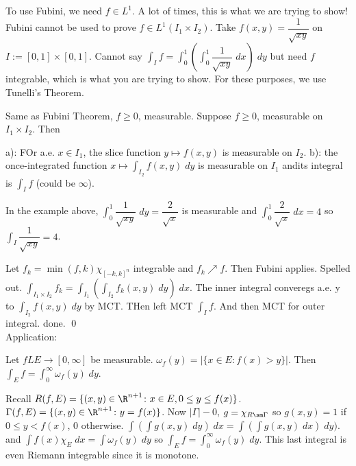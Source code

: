 To use Fubini, we need $f \in L^1$. A lot of times, this is what we are trying to show! Fubini cannot be used to prove $f \in L^1(I_1 \times I_2)$. Take $f(x,y)= \dfrac{1}{\sqrt{xy}}$ on $I:=[0,1] \times [0,1]$. Cannot say $\int_I f = \int_0^1( \int_0^1 \dfrac{1}{\sqrt{xy}} \; dx)\;dy$ but need $f$ integrable, which is what you are trying to show. For these purposes, we use Tunelli's Theorem.

\begin{thm}
Same as Fubini Theorem, $f \geq 0$, measurable. Suppose $f \geq 0$, measurable on $I_1 \times I_2$. Then 

a): FOr a.e. $x \in I_1$, the slice function $y \mapsto f(x,y)$ is measurable on $I_2$.
b): the once-integrated function $x \mapsto \int_{I_2} f(x,y) \; dy$ is measurable on $I_1$ andits integral is $\int_I f$ (could be $\infty$). 
\end{thm}


In the example above, $\int_0^1 \dfrac{1}{\sqrt{xy}} \; dy= \dfrac{2}{\sqrt{x}}$ is measurable and $\int_0^1 \dfrac{2}{\sqrt{x}} \; dx = 4$ so $\int_I \dfrac{1}{\sqrt{xy}}= 4$. 

\pf Let $f_k= \min(f,k) \chi_{[-k,k]^n}$ integrable and $f_k \nearrow f$. Then Fubini applies. Spelled out. $\int_{I_1 \times I_2} f_k = \int_{I_1} \left( \int_{I_2} f_k(x,y) \; dy \right) \; dx$. The inner integral converegs a.e. y to $\int_{I_2} f(x,y) \; dy$ by MCT. THen left MCT $\int_I f$. And then MCT for outer integral. done. \qed \\










Application: 

Let $fL E \to [0,\infty]$ be measurable. $\omega_f(y)= |\{x \in E \colon f(x)>y\}|$. Then $\int_E f = \int_0^\infty \omega_f(y) \; dy$. 

\pf Recall $R(f,E)= \{(x,y) \in \R^{n+1} \colon x \in E, 0 \leq y \leq f(x)\}$. $\Gamma(f,E)= \{(x,y) \in \R^{n+1} \colon y=f(x)\}$. Now $|\Gamma|-0$, $g= \chi_{R \sm \Gamma}$ so $g(x,y)=1$ if $0 \leq y<f(x)$, 0 otherwise. $\int(\int g(x,y) \; dy)\;dx= \int(\int g(x,y) \; dx) \; dy)$. and $\int f(x) \chi_E \; dx = \int \omega_f(y) \; dy$ so $\int_E f= \int_0^\infty \omega_f(y) \; dy$. This last integral is even Riemann integrable since it is monotone. 



